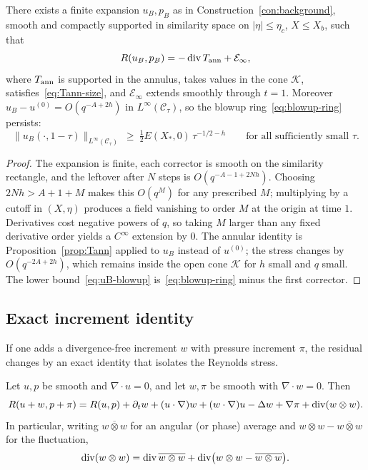 \begin{proposition}
\label{prop:background}
There exists a finite expansion $u_B,p_B$ as in Construction~\ref{con:background}, smooth and compactly supported in similarity space on $|\eta|\le\eta_c$, $X\le X_b$, such that
\begin{equation}
\label{eq:RB}
R(u_B,p_B)
=-\operatorname{div} T_{\mathrm{ann}}
+\mathcal E_{\infty},
\end{equation}
where $T_{\mathrm{ann}}$ is supported in the annulus, takes values in the cone $\mathcal K$, satisfies~\eqref{eq:Tann-size}, and $\mathcal E_{\infty}$ extends smoothly through $t=1$. Moreover $u_B-u^{(0)}=O(q^{-A+2h})$ in $L^\infty(\mathcal C_\tau)$, so the blowup ring~\eqref{eq:blowup-ring} persists:
\begin{equation}
\label{eq:uB-blowup}
\|u_B(\cdot,1-\tau)\|_{L^\infty(\mathcal C_\tau)}\ \ge\ \tfrac12 E(X_*,0)\,\tau^{-1/2-h}
\qquad\text{for all sufficiently small }\tau.
\end{equation}
\end{proposition}

\begin{proof}
The expansion is finite, each corrector is smooth on the similarity rectangle, and the leftover after $N$ steps is $O(q^{-A-1+2Nh})$. Choosing $2Nh>A+1+M$ makes this $O(q^{M})$ for any prescribed $M$; multiplying by a cutoff in $(X,\eta)$ produces a field vanishing to order $M$ at the origin at time $1$. Derivatives cost negative powers of $q$, so taking $M$ larger than any fixed derivative order yields a $C^\infty$ extension by $0$. The annular identity is Proposition~\ref{prop:Tann} applied to $u_B$ instead of $u^{(0)}$; the stress changes by $O(q^{-2A+2h})$, which remains inside the open cone $\mathcal K$ for $h$ small and $q$ small. The lower bound~\eqref{eq:uB-blowup} is~\eqref{eq:blowup-ring} minus the first corrector.
\end{proof}

\subsection{Exact increment identity}
\label{sec:increment}

If one adds a divergence-free increment $w$ with pressure increment $\pi$, the residual changes by an exact identity that isolates the {R}eynolds stress.

\begin{lemma}
\label{lem:increment}
Let $u,p$ be smooth and $\nabla\cdot u=0$, and let $w,\pi$ be smooth with $\nabla\cdot w=0$. Then
\begin{equation}
\label{eq:increment}
R(u+w,p+\pi)
=R(u,p)
+\partial_t w+(u\cdot\nabla)w+(w\cdot\nabla)u-\Delta w+\nabla\pi
+\operatorname{div}(w\otimes w).
\end{equation}
In particular, writing $\overline{w\otimes w}$ for an angular (or phase) average and $w\otimes w-\overline{w\otimes w}$ for the fluctuation,
\[
\operatorname{div}(w\otimes w)=\operatorname{div}\overline{w\otimes w}+\operatorname{div}\bigl(w\otimes w-\overline{w\otimes w}\bigr).
\]
\end{lemma}

